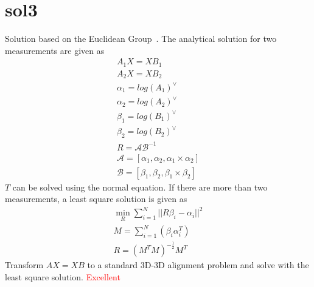 \documentclass[a4paper]{report}
\begin{document}
\section{sol3}
Solution based on the Euclidean Group~\cite{park1994robot}. The analytical solution for two measurements are given as
\begin{align}
A_1 X = X B_1 \nonumber \\
A_2 X = X B_2 \nonumber \\
\alpha_1 = log(A_1)^{\vee} \nonumber \\
\alpha_2 = log(A_2)^{\vee} \nonumber \\
\beta_1 = log(B_1)^{\vee} \nonumber \\
\beta_2 = log(B_2)^{\vee} \nonumber \\
R = \mathcal{A}\mathcal{B}^{-1} \\
\mathcal{A}=\left[ \alpha_1,\alpha_2, \alpha_1 \times \alpha_2 \right] \nonumber \\
\mathcal{B}=\left[ \beta_1,\beta_2, \beta_1 \times \beta_2 \right] \nonumber
\end{align}
$T$ can be solved using the normal equation. If there are more than two measurements, a least square solution is given as
\begin{align}
\min_{R} \sum_{i=1}^{N} || R\beta_i-\alpha_i ||^2 \\
M = \sum_{i=1}^{N} (\beta_i\alpha_i^T) \\
R = (M^TM)^{-\frac{1}{2}}M^T
\end{align}
Transform $AX=XB$ to a standard 3D-3D alignment problem and solve with the least square solution. \textcolor{red}{Excellent}
\end{document}

